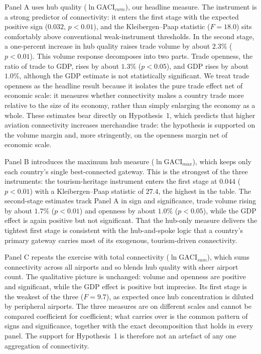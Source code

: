 Panel A uses hub quality ($\ln\mathrm{GACI}_{cwm}$), our headline measure. The
instrument is a strong predictor of connectivity: it enters the first stage with
the expected positive sign ($0.032$, $p<0.01$), and the Kleibergen--Paap
statistic ($F=18.0$) sits comfortably above conventional weak-instrument
thresholds. In the second stage, a one-percent increase in hub quality raises
trade volume by about $2.3\%$ ($p<0.01$). This volume response decomposes into two
parts. Trade openness, the ratio of trade to GDP, rises by about $1.3\%$
($p<0.05$), and GDP rises by about $1.0\%$, although the GDP estimate is not
statistically significant. We treat trade openness as the headline result because
it isolates the pure trade effect net of economic scale: it measures whether
connectivity makes a country trade more relative to the size of its economy,
rather than simply enlarging the economy as a whole. These estimates bear
directly on Hypothesis~1, which predicts that higher aviation connectivity
increases merchandise trade: the hypothesis is supported on the volume margin
and, more stringently, on the openness margin net of economic scale.

Panel B introduces the maximum hub measure ($\ln\mathrm{GACI}_{max}$), which keeps
only each country's single best-connected gateway. This is the strongest of the
three instruments: the tourism-heritage instrument enters the first stage at
$0.044$ ($p<0.01$) with a Kleibergen--Paap statistic of $27.4$, the highest in the
table. The second-stage estimates track Panel A in sign and significance, trade
volume rising by about $1.7\%$ ($p<0.01$) and openness by about $1.0\%$
($p<0.05$), while the GDP effect is again positive but not significant. That the
hub-only measure delivers the tightest first stage is consistent with the
hub-and-spoke logic that a country's primary gateway carries most of its
exogenous, tourism-driven connectivity.

Panel C repeats the exercise with total connectivity ($\ln\mathrm{GACI}_{sum}$),
which sums connectivity across all airports and so blends hub quality with sheer
airport count. The qualitative picture is unchanged: volume and openness are
positive and significant, while the GDP effect is positive but imprecise. Its
first stage is the weakest of the three ($F=9.7$), as expected once hub
concentration is diluted by peripheral airports. The three measures are on
different scales and cannot be compared coefficient for coefficient; what carries
over is the common pattern of signs and significance, together with the exact
decomposition that holds in every panel. The support for Hypothesis~1 is
therefore not an artefact of any one aggregation of connectivity.

